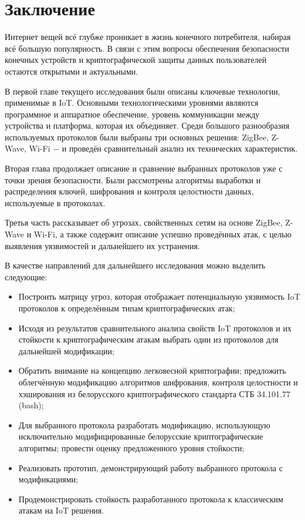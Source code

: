 \chapter*{Заключение}
	
	Интернет вещей всё глубже проникает в жизнь конечного потребителя, набирая всё большую популярность.
	В связи с этим вопросы обеспечения безопасности конечных устройств и криптографической защиты данных
	пользователей остаются открытыми и актуальными.
	
	В первой главе текущего исследования были описаны ключевые технологии, применимые в IoT. Основными
	технологическими уровнями являются программное и аппаратное обеспечение, уровень коммуникации
	между устройства и платформа, которая их объединяет. Среди большого разнообразия используемых
	протоколов были выбраны три основных решения: ZigBee, Z-Wave, Wi-Fi $-$ и проведён сравнительный анализ
	их технических характеристик.
	
	Вторая глава продолжает описание и сравнение выбранных протоколов уже с точки зрения безопасности.
	Были рассмотрены алгоритмы выработки и распределения ключей, шифрования и контроля целостности
	данных, используемые в протоколах.
	
	Третья часть рассказывает об угрозах, свойственных сетям на основе ZigBee, Z-Wave и Wi-Fi, а также
	содержит описание успешно проведённых атак, с целью выявления уязвимостей и дальнейшего их
	устранения.
	
	В качестве направлений для дальнейшего исследования можно выделить следующие:
	\begin{itemize}
		\item Построить матрицу угроз, которая отображает потенциальную уязвимость IoT протоколов 
		к определённым типам криптографических атак;
		\item Исходя из результатов сравнительного анализа свойств IoT протоколов и их стойкости 
		к криптографическим атакам выбрать один из протоколов для дальнейшей модификации;
		\item Обратить внимание на концепцию легковесной криптографии; предложить облегчённую 
		модификацию алгоритмов шифрования, контроля целостности и хэширования из белорусского 
		криптографического стандарта СТБ 34.101.77 (bash);
		\item Для выбранного протокола разработать модификацию, использующую исключительно 
		модифицированные белорусские криптографические алгоритмы; провести оценку предложенного 
		уровня стойкости;
		\item Реализовать прототип, демонстрирующий работу выбранного протокола с модификациями;
		\item Продемонстрировать стойкость разработанного протокола к классическим атакам на IoT решения.
	\end{itemize}
	